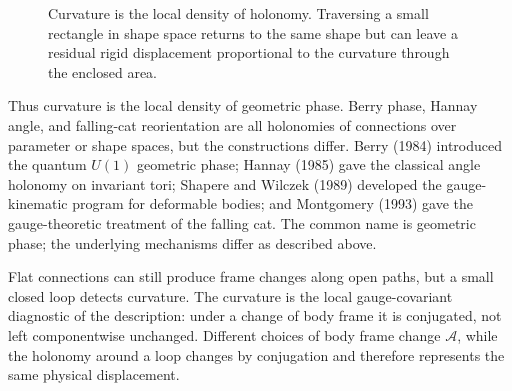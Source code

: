\begin{figure}[htbp]
\centering
{}
\caption{Curvature is the local density of holonomy. Traversing a small
rectangle in shape space returns to the same shape but can leave a residual
rigid displacement proportional to the curvature through the enclosed area.}
\label{fig:gauge-curvature-small-loop}
\end{figure}

Thus curvature is the local density of geometric phase. Berry phase, Hannay
angle, and falling-cat reorientation are all holonomies of connections over
parameter or shape spaces, but the constructions differ. Berry (1984)
introduced the quantum \(U(1)\) geometric phase; Hannay (1985) gave the
classical angle holonomy on invariant tori; Shapere and Wilczek (1989)
developed the gauge-kinematic program for deformable bodies; and Montgomery
(1993) gave the gauge-theoretic treatment of the falling cat. The common name
is geometric phase; the underlying mechanisms differ as described above.

Flat connections can still produce frame changes along open paths, but a small
closed loop detects curvature. The curvature is the local gauge-covariant
diagnostic of the description: under a change of body frame it is conjugated,
not left componentwise unchanged. Different choices of body frame change
\(\mathcal A\), while the holonomy around a loop changes by conjugation and
therefore represents the same physical displacement.

